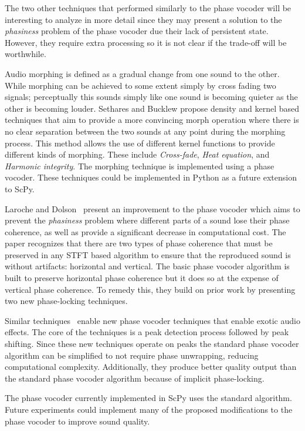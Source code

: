 \documentclass{article}
\begin{document}
The two other techniques that performed similarly to the phase vocoder will be interesting to
analyze in more detail since they may present a solution to the \textit{phasiness} problem of the
phase vocoder due their lack of persistent state. However, they require extra processing so it is
not clear if the trade-off will be worthwhile.

Audio morphing is defined as a gradual change from one sound to the other. While morphing can be
achieved to some extent simply by cross fading two signals; perceptually this sounds simply like
one sound is becoming quieter as the other is becoming louder. Sethares and Bucklew
\cite{sethares2012kernel} propose density and kernel based techniques that aim to provide a more
convincing morph operation where there is no clear separation between the two sounds at any point
during the morphing process. This method allows the use of different kernel functions to provide
different kinds of morphing. These include \textit{Cross-fade}, \textit{Heat equation}, and
\textit{Harmonic integrity}. The morphing technique is implemented using a phase vocoder. These
techniques could be implemented in Python as a future extension to ScPy.

Laroche and Dolson~\cite{laroche1999improved} present an improvement to the phase vocoder which
aims to prevent the \textit{phasiness} problem where different parts of a sound lose their phase
coherence, as well as provide a significant decrease in computational cost. The paper recognizes
that there are two types of phase coherence that must be preserved in any STFT based algorithm to
ensure that the reproduced sound is without artifacts: horizontal and vertical. The basic phase
vocoder algorithm is built to preserve horizontal phase coherence but it does so at the expense
of vertical phase coherence. To remedy this, they build on prior work by presenting two new
phase-locking techniques.

Similar techniques~\cite{laroche1999new} enable new phase vocoder techniques that enable
exotic audio effects. The core of the techniques is a peak detection process followed by peak
shifting. Since these new techniques operate on peaks the standard phase vocoder algorithm can be
simplified to not require phase unwrapping, reducing computational complexity. Additionally, they
produce better quality output than the standard phase vocoder algorithm because of implicit
phase-locking.

The phase vocoder currently implemented in ScPy uses the standard algorithm. Future experiments
could implement many of the proposed modifications to the phase vocoder to improve sound quality.
\end{document}
